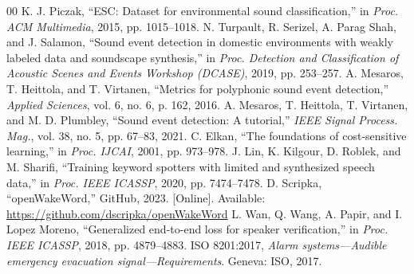 \documentclass[conference,a4paper]{IEEEtran}
\begin{document}
\begin{thebibliography}{00}
 K. J. Piczak, ``ESC: Dataset for environmental sound classification,'' in \textit{Proc. ACM Multimedia}, 2015, pp. 1015--1018.
 N. Turpault, R. Serizel, A. Parag Shah, and J. Salamon, ``Sound event detection in domestic environments with weakly labeled data and soundscape synthesis,'' in \textit{Proc. Detection and Classification of Acoustic Scenes and Events Workshop (DCASE)}, 2019, pp. 253--257.
 A. Mesaros, T. Heittola, and T. Virtanen, ``Metrics for polyphonic sound event detection,'' \textit{Applied Sciences}, vol. 6, no. 6, p. 162, 2016.
 A. Mesaros, T. Heittola, T. Virtanen, and M. D. Plumbley, ``Sound event detection: A tutorial,'' \textit{IEEE Signal Process. Mag.}, vol. 38, no. 5, pp. 67--83, 2021.
 C. Elkan, ``The foundations of cost-sensitive learning,'' in \textit{Proc. IJCAI}, 2001, pp. 973--978.
 J. Lin, K. Kilgour, D. Roblek, and M. Sharifi, ``Training keyword spotters with limited and synthesized speech data,'' in \textit{Proc. IEEE ICASSP}, 2020, pp. 7474--7478.
 D. Scripka, ``openWakeWord,'' GitHub, 2023. [Online]. Available: \url{https://github.com/dscripka/openWakeWord}
 L. Wan, Q. Wang, A. Papir, and I. Lopez Moreno, ``Generalized end-to-end loss for speaker verification,'' in \textit{Proc. IEEE ICASSP}, 2018, pp. 4879--4883.
 ISO 8201:2017, \textit{Alarm systems---Audible emergency evacuation signal---Requirements}. Geneva: ISO, 2017.
\end{thebibliography}
\end{document}

